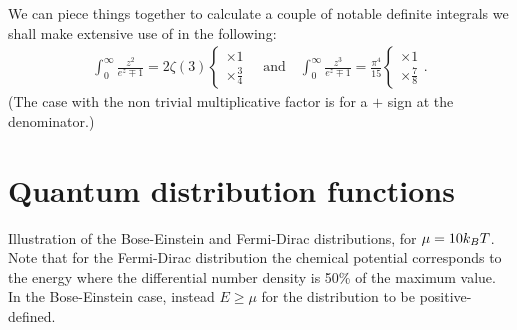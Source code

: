 We can piece things together to calculate a couple of notable definite integrals
we shall make extensive use of in the following:
\begin{align}\label{eq:qstats_notable_integrals}
  \int_0^\infty \frac{z^2}{e^z \mp 1} = 2\zeta(3)
  \begin{cases}
    \times 1\\
    \times \frac{3}{4}
  \end{cases}
  \quad \text{and} \quad
  \int_0^\infty \frac{z^3}{e^z \mp 1} = \frac{\pi^4}{15}
  \begin{cases}
    \times 1\\
    \times \frac{7}{8}
  \end{cases}.
\end{align}
(The case with the non trivial multiplicative factor is for a $+$ sign at the
denominator.)



\section{Quantum distribution functions}
\label{sec:quantum_statistics}

\begin{marginfigure}
  
  \caption{Illustration of the Bose-Einstein and Fermi-Dirac distributions, for
    $\mu = 10 k_B T$. Note that for the Fermi-Dirac distribution the chemical
    potential corresponds to the energy where the differential number density is
    50\% of the maximum value. In the Bose-Einstein case, instead $E \geq \mu$ for
    the distribution to be positive-defined.}
  \label{fig:quantum_statistics}
\end{marginfigure}

